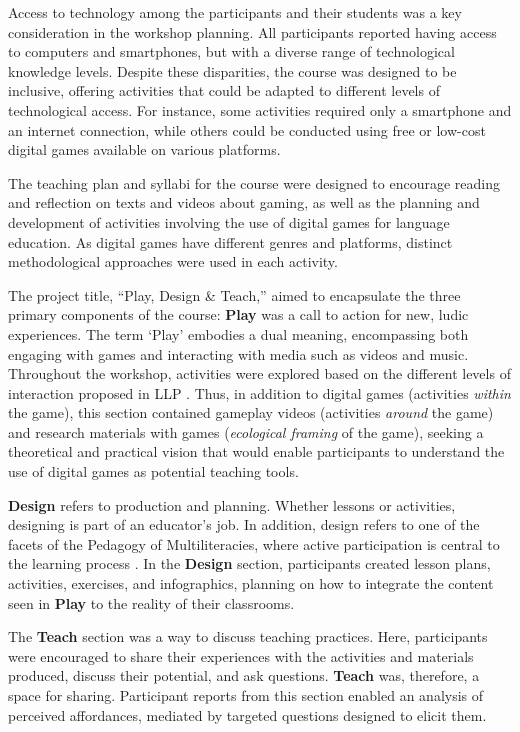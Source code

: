\documentclass[english]{textolivre}
\begin{document}
Access to technology among the participants and their students was a key consideration in the workshop planning. All participants reported having access to computers and smartphones, but with a diverse range of technological knowledge levels. Despite these disparities, the course was designed to be inclusive, offering activities that could be adapted to different levels of technological access. For instance, some activities required only a smartphone and an internet connection, while others could be conducted using free or low-cost digital games available on various platforms.

The teaching plan and syllabi for the course were designed to encourage reading and reflection on texts and videos about gaming, as well as the planning and development of activities involving the use of digital games for language education. As digital games have different genres and platforms, distinct methodological approaches were used in each activity.

The project title, “Play, Design \& Teach,” aimed to encapsulate the three primary components of the course: \textbf{Play} was a call to action for new, ludic experiences. The term ‘Play’ embodies a dual meaning, encompassing both engaging with games and interacting with media such as videos and music. Throughout the workshop, activities were explored based on the different levels of interaction proposed in LLP \cite{york2021playing}. Thus, in addition to digital games (activities \textit{within} the game), this section contained gameplay videos (activities \textit{around} the game) and research materials with games (\textit{ecological framing} of the game), seeking a theoretical and practical vision that would enable participants to understand the use of digital games as potential teaching tools.

\textbf{Design} refers to production and planning. Whether lessons or activities, designing is part of an educator’s job. In addition, design refers to one of the facets of the Pedagogy of Multiliteracies, where active participation is central to the learning process \cite{newlondongroup1996multiliteracies,cope2015things}. In the \textbf{Design} section, participants created lesson plans, activities, exercises, and infographics, planning on how to integrate the content seen in \textbf{Play} to the reality of their classrooms.

The \textbf{Teach} section was a way to discuss teaching practices. Here, participants were encouraged to share their experiences with the activities and materials produced, discuss their potential, and ask questions. \textbf{Teach} was, therefore, a space for sharing. Participant reports from this section enabled an analysis of perceived affordances, mediated by targeted questions designed to elicit them.
\end{document}
